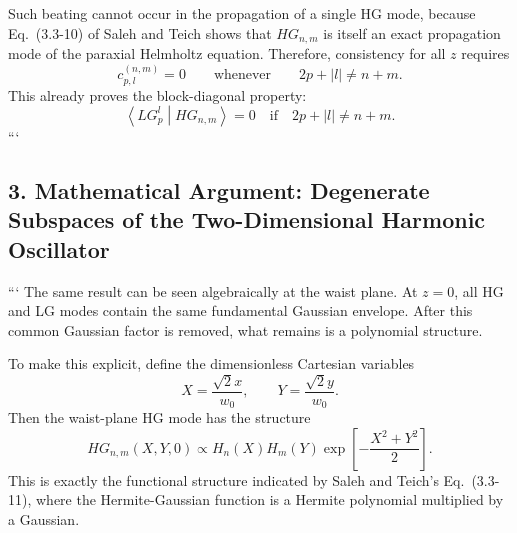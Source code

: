 \begin{resolucao}[Solution]
Such beating cannot occur in the propagation of a single HG mode, because Eq.~(3.3-10) of Saleh and Teich shows that $HG_{n,m}$ is itself an exact propagation mode of the paraxial Helmholtz equation. Therefore, consistency for all $z$ requires
\begin{equation}
    c_{p,l}^{(n,m)}=0
    \qquad
    \text{whenever}
    \qquad
    2p+|l|\neq n+m.
    \label{eq:block_condition}
\end{equation}
This already proves the block-diagonal property:
\begin{equation}
    \boxed{
    \left\langle
    LG_p^l
    \middle|
    HG_{n,m}
    \right\rangle
    =
    0
    \quad
    \text{if}
    \quad
    2p+|l|\neq n+m.
    }
    \label{eq:overlap_selection_rule}
\end{equation}
```

\subsection*{3. Mathematical Argument: Degenerate Subspaces of the Two-Dimensional Harmonic Oscillator}

```
The same result can be seen algebraically at the waist plane. At $z=0$, all HG and LG modes contain the same fundamental Gaussian envelope. After this common Gaussian factor is removed, what remains is a polynomial structure.

To make this explicit, define the dimensionless Cartesian variables
\begin{equation}
    X=\frac{\sqrt{2}x}{w_0},
    \qquad
    Y=\frac{\sqrt{2}y}{w_0}.
    \label{eq:dimensionless_cartesian}
\end{equation}
Then the waist-plane HG mode has the structure
\begin{equation}
    HG_{n,m}(X,Y,0)
    \propto
    H_n(X)H_m(Y)
    \exp\left[
        -\frac{X^2+Y^2}{2}
    \right].
    \label{eq:HG_waist_polynomial}
\end{equation}
This is exactly the functional structure indicated by Saleh and Teich's Eq.~(3.3-11), where the Hermite-Gaussian function is a Hermite polynomial multiplied by a Gaussian.


\end{resolucao}
